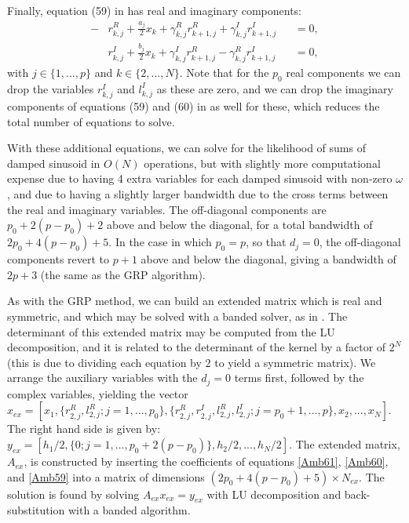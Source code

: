 \documentclass[manuscript, letterpaper]{aastex6}
\begin{document}
Finally, equation (59) in \citet{Ambikasaran:2015} has real and imaginary components:
\begin{align} \label{Amb59}
-&r_{k,j}^R + \frac{a_j}{2} x_k + \gamma_{k,j}^R r_{k+1,j}^R + \gamma_{k,j}^I r_{k+1,j}^I &&=0,\\
 &r_{k,j}^I + \frac{b_j}{2} x_k + \gamma_{k,j}^I r_{k+1,j}^R - \gamma_{k,j}^R r_{k+1,j}^I &&=0,
\end{align}
with $j \in \{1,...,p\}$ and $k \in \{2,...,N\}$.  Note that for the $p_0$ real components
we can drop the variables $r_{k,j}^I$ and $l_{k,j}^I$ as these are zero, and we can drop the
imaginary components of equations (59) and (60) in \citet{Ambikasaran:2015} as well for these, which reduces the total number
of equations to solve.

With these additional equations, we can solve for the likelihood of sums of damped sinusoid
in $O(N)$ operations, but with slightly more computational expense due to having 4 extra variables
for each damped sinusoid with non-zero $\omega$, and due to having a slightly larger bandwidth due to the
cross terms between the real and imaginary variables.  The off-diagonal components are $p_0+2(p-p_0)+2$ above
and below the diagonal, for a total bandwidth of $2p_0+4(p-p_0)+5$. In the case in which $p_0=p$, so
that $d_j=0$, the off-diagonal components revert to $p+1$
above and below the diagonal, giving a bandwidth of $2p+3$ (the same as the GRP algorithm).

As with the GRP method, we can build an extended matrix which is real and symmetric, and which may be
solved with a banded solver, as in \citet{NumericalRecipes}.  The determinant of this extended matrix
may be computed from the LU decomposition, and it is related to the determinant of the kernel by a
factor of $2^N$ (this is due to dividing each equation by $2$ to yield a symmetric matrix).
We arrange the auxiliary variables with the $d_j=0$
terms first, followed by the complex variables, yielding the vector
$x_{ex} = [x_1, \{r_{2,j}^R,l_{2,j}^R;j=1,...,p_0\}, \{r_{2,j}^R,r_{2,j}^I,l_{2,j}^R,l_{2,j}^I;j=p_0+1,...,p\},
x_2, ..., x_N]$.  The right hand side is given by: $y_{ex} = [h_1/2, \{0; j=1,...,p_0+2(p-p_0)\}, h_2/2, ..., h_N/2]$.
The extended matrix, $A_{ex}$, is constructed by inserting the coefficients of equations \ref{Amb61},
\ref{Amb60}, and \ref{Amb59} into a matrix of dimensions $(2p_0+4(p-p_0)+5) \times N_{ex}$.
The solution is found by solving $A_{ex} x_{ex} = y_{ex}$ with LU decomposition and back-substitution
with a banded algorithm.
\end{document}
